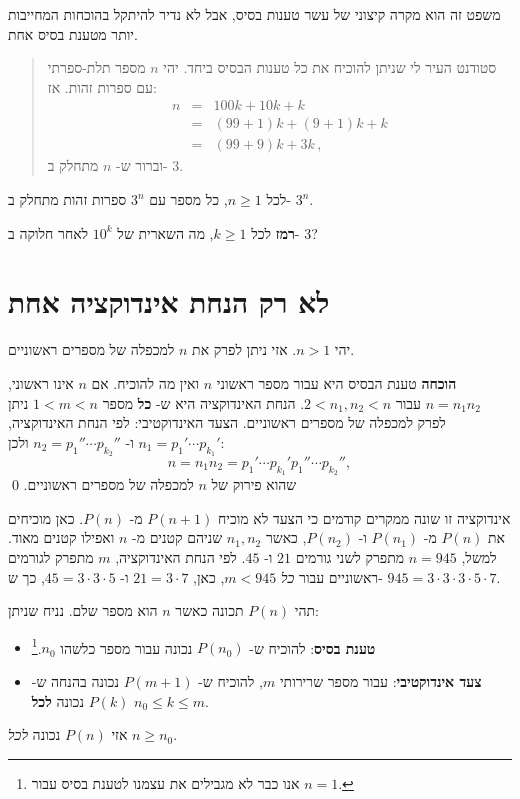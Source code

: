 משפט זה הוא מקרה קיצוני של עשר טענות בסיס, אבל לא נדיר להיתקל בהוכחות המחייבות יותר מטענת בסיס אחת.

\begin{quote}
סטודנט העיר לי שניתן להוכיח את כל טענות הבסיס ביחד. יהי
$n$
מספר תלת-ספרתי עם ספרות זהות. אז:
\begin{eqnarray*}
n &=& 100k + 10k +k\\
&=& (99+1)k + (9+1)k + k\\
&=& (99+9)k + 3k\,,
\end{eqnarray*}
וברור ש-%
$n$
מתחלק ב-%
$3$.
\end{quote}

\begin{exercise}
לכל
$n\geq 1$,
כל מספר עם
$3^n$
ספרות זהות מתחלק ב-%
$3^n$.
\end{exercise}
\textbf{רמז}
לכל
$k\geq 1$,
מה השארית של
$10^k$
לאחר חלוקה ב-%
$3$?

\section{%
לא רק הנחת אינדוקציה אחת%
}

\begin{theorem}\label{t.prime}
יהי
$n>1$.
אזי ניתן לפרק את
$n$
למכפלה של מספרים ראשוניים.
\end{theorem}

\textbf{הוכחה} 
טענת הבסיס היא עבור מספר ראשוני
$n$
ואין מה להוכיח.
אם
$n$
אינו ראשוני,
$n=n_1 n_2$
עבור
$2 < n_1, n_2 < n$.
הנחת האינדוקציה היא ש-%
\textbf{כל}
מספר
$1<m<n$
ניתן לפרק למכפלה של מספרים ראשוניים. הצעד האינדוקטיבי: לפי הנחת האינדוקציה,
$n_1=p_1' \cdots p_{k_1}'$
ו-%
$n_2=p_1'' \cdots p_{k_2}''$
ולכן:
\[
n = n_1 n_2 = p_1' \cdots p_{k_1}' p_1'' \cdots p_{k_2}'',
\]
שהוא פירוק של
$n$
למכפלה של מספרים ראשוניים.
\qed

אינדוקציה זו שונה ממקרים קודמים כי הצעד לא מוכיח 
$P(n+1)$
מ-%
$P(n)$.
כאן מוכיחים את
$P(n)$
מ-%
$P(n_1)$
ו-%
$P(n_2)$,
כאשר 
$n_1,n_2$
שניהם קטנים מ-%
$n$
ואפילו קטנים מאוד. למשל,
$n=945$
מתפרק לשני גורמים
$21$
ו-%
$45$.
לפי הנחת האינדוקציה,
$m$
מתפרק לגורמים ראשוניים עבור
\emph{כל}
$m<945$,
כאן,
$21=3\cdot 7$
ו-%
$45=3\cdot 3\cdot 5$,
כך ש-%
$945=3\cdot 3\cdot 3\cdot 5\cdot 7$.

\begin{axiom}
תהי
$P(n)$
תכונה כאשר
$n$
הוא מספר שלם. נניח שניתן:
\begin{itemize}
\item \textbf{טענת בסיס}:
להוכיח ש-%
$P(n_0)$
נכונה עבור מספר כלשהו
$n_0$.\footnote{%
אנו כבר לא מגבילים את עצמנו לטענת בסיס עבור
$n=1$.} 
\item \textbf{צעד אינדוקטיבי}:
עבור מספר שרירותי
$m$,
להוכיח ש-%
$P(m+1)$
נכונה בהנחה ש-%
$P(k)$
נכונה
\textbf{לכל}
$n_0\leq k\leq m$.
\end{itemize}
אזי
$P(n)$
נכונה
\emph{לכל}
$n\geq n_0$.
\end{axiom}

